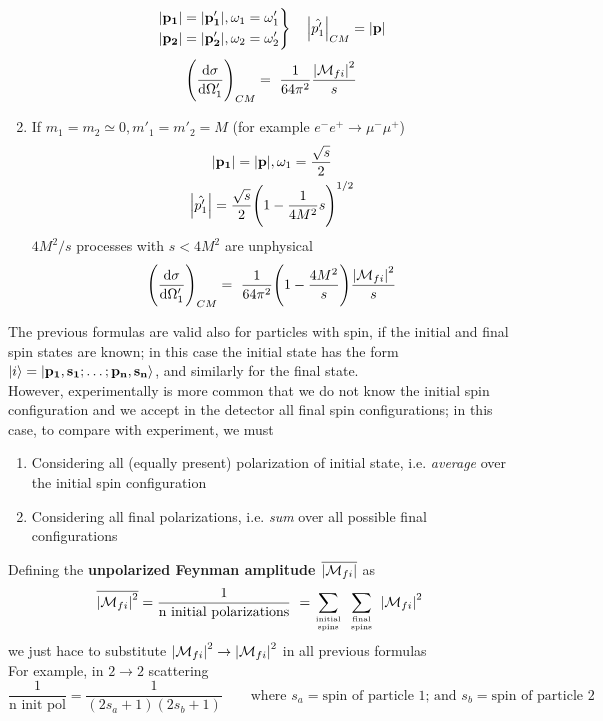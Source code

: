\documentclass[TheoreticalPhy_ModB.tex]{subfiles}
\begin{document}
\begin{example}[$2 \to 2$ scattering]
\begin{enumerate}[label=(\Alph*)]
	\begin{equation*}
	\left. \begin{aligned}
	\abs{\mathbf{p_1}} = \abs{\mathbf{p'_1}}, \omega_1 = \omega'_1 \\
	\abs{\mathbf{p_2}} = \abs{\mathbf{p'_2}}, \omega_2 = \omega'_2
	\end{aligned}
	\right \}
	\quad \abs{\hat{p'_1}}_{CM} = \abs{\mathbf{p}}
	\end{equation*}
	\[
	\Biggl( \frac{\textup{d} \sigma}{\textup{d} \Omega'_1} \Biggr)_{CM} = \ \frac{1}{64 \pi^2} \frac{\abs{\mathcal{M}_{fi}}^2}{s}
	\]
\item If $m_1 = m_2 \simeq 0, m'_1 = m'_2 = M$ (for example $e^-e^+ \to \mu^- \mu^+$)
	\begin{gather}
	\abs{\mathbf{p_1}} = \abs{\mathbf{p}}, \omega_1 = \frac{\sqrt{s}}{2} \notag \\
	\abs{\hat{p'_1}} = \frac{\sqrt{s}}{2} \Biggl( 1 - \frac{1}{4M^2}{s} \Biggr)^{1/2} 
	\end{gather}
$4M^2/s$ processes with $s < 4M^2$ are unphysical
	\[
	\Biggl( \frac{\textup{d} \sigma}{\textup{d} \Omega'_1} \Biggr)_{CM} = \ \frac{1}{64 \pi^2} 
	\Biggl( 1 - \frac{4M^2}{s} \Biggr)
	\frac{\abs{\mathcal{M}_{fi}}^2}{s}
	\]
\end{enumerate}
\end{example}

The previous formulas are valid also for particles with spin, if the initial and final spin states are known; in this case the initial state has the form $\ket{i} = \ket{\mathbf{p_1}, \mathbf{s_1}; \dots; \mathbf{p_n}, \mathbf{s_n}}$, and similarly for the final state.\\
However, experimentally is more common that we do not know the initial spin configuration and we accept in the detector all final spin configurations; in this case, to compare with experiment, we must
\begin{enumerate}
\item Considering all (equally present) polarization of initial state, i.e. \textit{average} over the initial spin configuration
\item Considering all final polarizations, i.e. \textit{sum} over all possible final configurations
\end{enumerate}
Defining the \textbf{unpolarized Feynman amplitude $\overline{\abs{\mathcal{M}_{fi}}}$} as
\[
\overline{\abs{\mathcal{M}_{fi}}^2} = \frac{1}{\textup{n initial polarizations}} \
	=\sum _{\text{initial} \atop \text{spins}} \ \sum _{\text{final} \atop \text{spins}} \ \abs{\mathcal{M}_{fi}}^{2}
\]
we just hace to substitute $\abs{\mathcal{M}_{fi}}^2 \to \abs{\mathcal{M}_{fi}}^2$ in all previous formulas\\
For example, in $2 \to 2$ scattering
\[
\frac{1}{\text{n init pol}} = \frac{1}{(2 s_a + 1)(2 s_b + 1)}
\qquad \text{where } s_a = \text{spin of particle 1; and } s_b = \text{spin of particle 2}
\]
\end{document}
